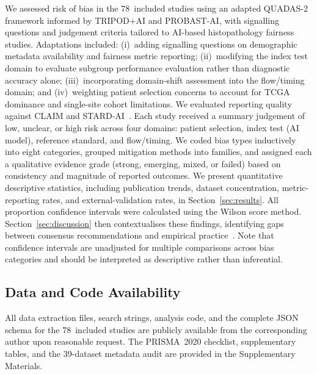 \label{sec:methods:rob}
\label{sec:methods:synthesis}
We assessed risk of bias in the 78~included studies using an
adapted QUADAS-2 framework informed by TRIPOD+AI and PROBAST-AI, with signalling questions and judgement criteria tailored to AI-based histopathology fairness studies. Adaptations included: (i)~adding signalling questions on demographic metadata availability and fairness metric reporting; (ii)~modifying the index test domain to evaluate subgroup performance evaluation rather than diagnostic accuracy alone; (iii)~incorporating domain-shift assessment into the flow/timing domain; and (iv)~weighting patient selection concerns to account for TCGA dominance and single-site cohort limitations. We
evaluated reporting quality against CLAIM and
STARD-AI~\citep{claim2020checklist, sounderajah2021stardai}. Each study received a summary judgement of low,
unclear, or high risk across four domains: patient selection, index
test (AI model), reference standard, and flow/timing. We coded bias types inductively
into eight categories, grouped mitigation methods into
families, and assigned each a qualitative evidence grade (strong, emerging,
mixed, or failed) based on consistency and magnitude of reported
outcomes.
We present quantitative descriptive statistics, including publication trends, dataset concentration, metric-reporting rates, and external-validation rates, in
Section~\ref{sec:results}. All proportion confidence intervals were calculated using the Wilson score method. Section~\ref{sec:discussion} then contextualises these findings,
identifying gaps between consensus recommendations and empirical
practice~\citep{riccilara2022addressing, chen2023algorithmic,
musa2026cross}. Note that confidence intervals are unadjusted for multiple comparisons across bias categories and should be interpreted as descriptive rather than inferential.

\subsection*{Data and Code Availability}
All data extraction files, search strings, analysis code, and the complete JSON schema for the 78~included studies are publicly available from the corresponding author upon reasonable request. The PRISMA~2020 checklist, supplementary tables, and the 39-dataset metadata audit are provided in the Supplementary Materials.
